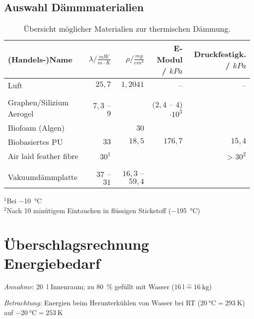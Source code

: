 		\subsection{Auswahl Dämmmaterialien}
			\begin{table}[H]
				\centering
				\caption{Übersicht möglicher Materialien zur thermischen Dämmung.}
				\begin{tabular}{@{}lrrrr@{}}
					\toprule
					(Handels-)Name																& \(\lambda / \frac{mW}{m \cdot K}\)	& \(\rho / \frac{mg}{cm^3}\)	& E-Modul / \(kPa\) 				& Druckfestigk. / \(kPa\) \\
					\midrule
					Luft 																		&\(25,7\)						&\(1,2041\)						&--									&-- \\
					&&&&\\
					Graphen/Silizium Aerogel \cite{silica.graphene.aerogel.Lei.2017} 			& \(7,3\) -- \(9\)			&								&\((2,4\) -- \(4\))\(\cdot 10^3\)	&\\
					Biofoam (Algen) \cite{Biofoam2.Morrison.1994}								&								&30								&									&\\
					Biobasiertes PU \cite{Biobased.PU.HuangX.QiJ.DeHoopC.XieJ.andChenY.2017}	&\(33\)							&\(18,5\)						&\(176,7\)							&\(15,4\)\\
					Air laid feather fibre \cite{air.laid.feather.fibre.Zhao.2020} 				& \(30^1\)		&								&									& \( > 30^2 \) \\
					&&&&\\
					Vakuumdämmplatte \cite{Vakuumplate.Nagarajan.2013}							&\(37\) -- \(31\)			&\(16,3\) -- \(59,4\)		&									&\\
					\bottomrule
				\end{tabular}
			\end{table}
			\( ^1 \)Bei \SI{-10}{\celsius}\\
			\( ^2 \)Nach 10 minütigem Eintauchen in flüssigen Stickstoff (\SI{-195}{\celsius})

	\section{Überschlagsrechnung Energiebedarf}
		\textit{Annahme}:
		\SI{20}{\litre} Innenraum; zu \SI{80}{\percent} gefüllt mit Wasser (\( \SI{16}{\litre} \widehat{=} \SI{16}{\kilo\gram} \))\par\medskip
		\textit{Betrachtung:}
		Energien beim Herunterkühlen von Wasser bei RT (\( \SI{20}{\celsius} = \SI{293}{\kelvin} \)) auf \( \SI{-20}{\celsius} = \SI{253}{\kelvin} \)\par\medskip

